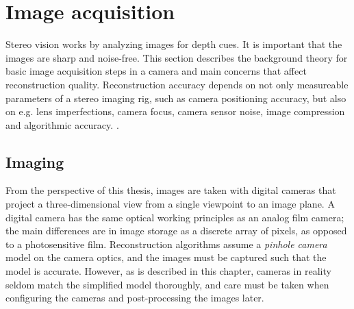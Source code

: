 


\section{Image acquisition} \label{sec:image-acquisition}




Stereo vision works by analyzing images for depth cues.
It is important that the images are sharp and noise-free.
This section describes the background theory for basic image acquisition steps in a camera and main concerns that affect reconstruction quality.
Reconstruction accuracy depends on not only measureable parameters of a stereo imaging rig, such as camera positioning accuracy, but also on e.g. lens imperfections, camera focus, camera sensor noise, image compression and algorithmic accuracy. \cite{hollsten2013imagequality,kyto2011method,rieke2009evaluation}.

\subsection{Imaging} \label{sec:imaging} %

From the perspective of this thesis, images are taken with digital cameras that project a three-dimensional view from a single viewpoint to an image plane.
A digital camera has the same optical working principles as an analog film camera;
the main differences are in image storage as a discrete array of pixels, as opposed to a photosensitive film.
Reconstruction algorithms assume a \emph{pinhole camera} model on the camera optics, and the images must be captured such that the model is accurate.
However, as is described in this chapter, cameras in reality seldom match the simplified model thoroughly, and care must be taken when configuring the cameras and post-processing the images later.

